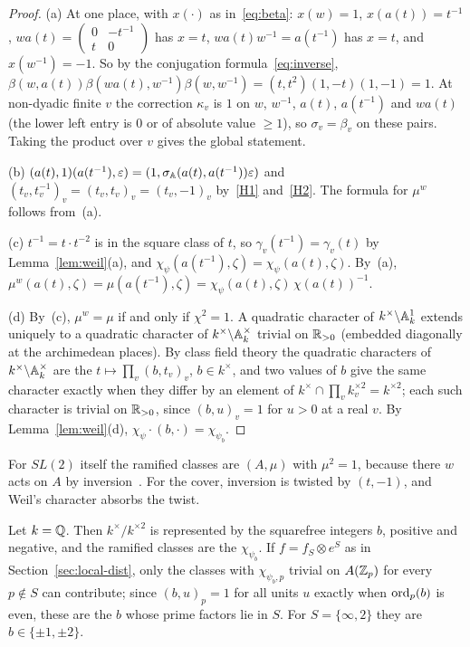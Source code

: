 \begin{proof}
(a) At one place, with $x(\cdot)$ as in~\eqref{eq:beta}: $x(w)=1$,
$x(a(t))=t^{-1}$, $wa(t)=\begin{pmatrix}0&-t^{-1}\\t&0\end{pmatrix}$ has
$x=t$, $wa(t)w^{-1}=a(t^{-1})$ has $x=t$, and $x(w^{-1})=-1$. So by the
conjugation formula~\eqref{eq:inverse},
$\beta(w,a(t))\beta(wa(t),w^{-1})\beta(w,w^{-1})=(t,t^2)(1,-t)(1,-1)=1$.
At non-dyadic finite $v$ the correction $\kappa_v$ is $1$ on $w$,
$w^{-1}$, $a(t)$, $a(t^{-1})$ and $wa(t)$ (the lower left entry is $0$ or
of absolute value $\ge1$), so $\sigma_v=\beta_v$ on these pairs. Taking
the product over $v$ gives the global statement.

(b) $(a(t),1)(a(t^{-1}),\varepsilon)=(1,\sigma_{\mathbb{A}}(a(t),a(t^{-1}))
\varepsilon)$ and $(t_v,t_v^{-1})_v=(t_v,t_v)_v=(t_v,-1)_v$ by~\ref{H1}
and~\ref{H2}. The formula for $\mu^w$ follows from~(a).

(c) $t^{-1}=t\cdot t^{-2}$ is in the square class of $t$, so
$\gamma_v(t^{-1})=\gamma_v(t)$ by Lemma~\ref{lem:weil}(a), and
$\chi_\psi(a(t^{-1}),\zeta)=\chi_\psi(a(t),\zeta)$. By~(a),
$\mu^w(a(t),\zeta)=\mu(a(t^{-1}),\zeta)=\chi_\psi(a(t),\zeta)\,
\chi(a(t))^{-1}$.

(d) By~(c), $\mu^w=\mu$ if and only if $\chi^2=1$. A quadratic character
of $k^\times\backslash\mathbb{A}_k^1$ extends uniquely to a quadratic character of
$k^\times\backslash\mathbb{A}_k^\times$ trivial on $\mathbb{R}_{>0}$ (embedded diagonally
at the archimedean places). By class field theory the quadratic
characters of $k^\times\backslash\mathbb{A}_k^\times$ are the
$t\mapsto\prod_v(b,t_v)_v$, $b\in k^\times$, and two values of $b$ give
the same character exactly when they differ by an element of
$k^\times\cap\prod_vk_v^{\times2}=k^{\times2}$; each such character is
trivial on $\mathbb{R}_{>0}$, since $(b,u)_v=1$ for $u>0$ at a real $v$. By
Lemma~\ref{lem:weil}(d), $\chi_\psi\cdot(b,\cdot)=\chi_{\psi_b}$.
\end{proof}

For $SL(2)$ itself the ramified classes are $(A,\mu)$ with $\mu^2=1$,
because there $w$ acts on $A$ by inversion~\cite{LL79}. For the cover,
inversion is twisted by $(t,-1)$, and Weil's character absorbs the twist.

\begin{example}\label{ex:ramified-Q}
Let $k=\mathbb{Q}$. Then $k^\times/k^{\times2}$ is represented by the squarefree
integers $b$, positive and negative, and the ramified classes are the
$\chi_{\psi_b}$. If $f=f_S\otimes e^S$ as in Section~\ref{sec:local-dist},
only the classes with $\chi_{\psi_b,p}$ trivial on $A(\mathbb{Z}_p)$ for every
$p\notin S$ can contribute; since $(b,u)_p=1$ for all units $u$ exactly
when $\operatorname{ord}_p(b)$ is even, these are the $b$ whose prime factors lie in
$S$. For $S=\{\infty,2\}$ they are $b\in\{\pm1,\pm2\}$.
\end{example}

